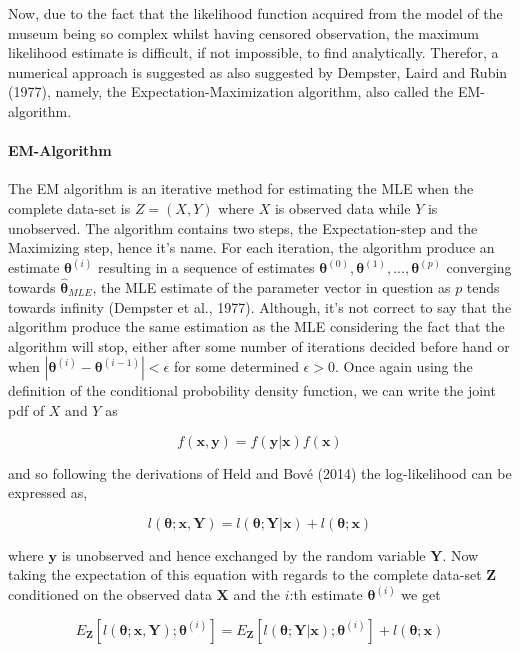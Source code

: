\documentclass[]{article}
\let\oldparagraph\paragraph
\renewcommand{\paragraph}[1]{\oldparagraph{#1}\mbox{}}
\begin{document}
Now, due to the fact that the likelihood function acquired from the
model of the museum being so complex whilst having censored observation,
the maximum likelihood estimate is difficult, if not impossible, to find
analytically. Therefor, a numerical approach is suggested as also
suggested by Dempster, Laird and Rubin (1977), namely, the
Expectation-Maximization algorithm, also called the EM-algorithm.

\paragraph{EM-Algorithm}\label{em-algorithm}

The EM algorithm is an iterative method for estimating the MLE when the
complete data-set is \(Z=(X,Y)\) where \(X\) is observed data while
\(Y\) is unobserved. The algorithm contains two steps, the
Expectation-step and the Maximizing step, hence it's name. For each
iteration, the algorithm produce an estimate \(\mathbf{\theta}^{(i)}\)
resulting in a sequence of estimates
\(\mathbf{\theta}^{(0)}, \mathbf{\theta}^{(1)},...,\mathbf{\theta}^{(p)}\)
converging towards \(\hat{\mathbf{\theta}}_{MLE}\), the MLE estimate of
the parameter vector in question as \(p\) tends towards infinity
(Dempster et al., 1977). Although, it's not correct to say that the
algorithm produce the same estimation as the MLE considering the fact
that the algorithm will stop, either after some number of iterations
decided before hand or when
\(|\mathbf{\theta}^{(i)} - \mathbf{\theta}^{(i-1)}| < \epsilon\) for
some determined \(\epsilon > 0\). Once again using the definition of the
conditional probobility density function, we can write the joint pdf of
\(X\) and \(Y\) as

\[
f(\mathbf{x},\mathbf{y}) = f(\mathbf{y}|\mathbf{x}) f(\mathbf{x})
\]

and so following the derivations of Held and Bové (2014) the
log-likelihood can be expressed as,

\[
l(\mathbf{\theta};\mathbf{x},\mathbf{Y}) = l(\mathbf{\theta};\mathbf{Y}|\mathbf{x}) + l(\mathbf{\theta};\mathbf{x})
\]

where \(\mathbf{y}\) is unobserved and hence exchanged by the random
variable \(\mathbf{Y}\). Now taking the expectation of this equation
with regards to the complete data-set \(\mathbf{Z}\) conditioned on the
observed data \(\mathbf{X}\) and the \(i\):th estimate
\(\mathbf{\theta}^{(i)}\) we get

\[
E_{\mathbf{Z}}[l(\mathbf{\theta};\mathbf{x},\mathbf{Y}) ; \mathbf{\theta}^{(i)}] = E_\mathbf{Z}[l(\mathbf{\theta};\mathbf{Y}|\mathbf{x}); \mathbf{\theta}^{(i)}] + l(\mathbf{\theta};\mathbf{x})
\]
\end{document}
